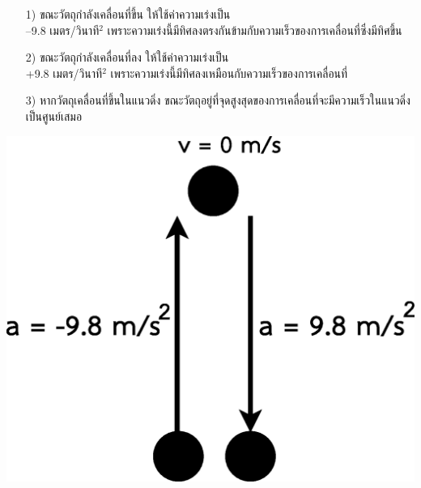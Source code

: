\tcblower
\begin{minipage}{.6\textwidth}
\begin{itemize}[leftmargin=*]
	\item[1)] ขณะวัตถุกำลังเคลื่อนที่ขึ้น \hfill  ให้ใช้ค่าความเร่งเป็น \\–9.8  เมตร/วินาที$^2$  เพราะความเร่งนี้มีทิศลงตรงกันข้ามกับความเร็วของการเคลื่อนที่ซึ่งมีทิศขึ้น
	\item[2)] ขณะวัตถุกำลังเคลื่อนที่ลง \hfill  ให้ใช้ค่าความเร่งเป็น \\+9.8  เมตร/วินาที$^2$       เพราะความเร่งนี้มีทิศลงเหมือนกับความเร็วของการเคลื่อนที่
	\item[3)] หากวัตถุเคลื่อนที่ขึ้นในแนวดิ่ง  ขณะวัตถุอยู่ที่จุดสูงสุดของการเคลื่อนที่จะมีความเร็วในแนวดิ่งเป็นศูนย์เสมอ 
\end{itemize}
\end{minipage}
\hfill
\begin{adjustbox}{valign=c} \begin{minipage}[t]{.35\linewidth}
\includegraphics[width=\linewidth]{content-7.eps}
\end{minipage}
\end{adjustbox}
